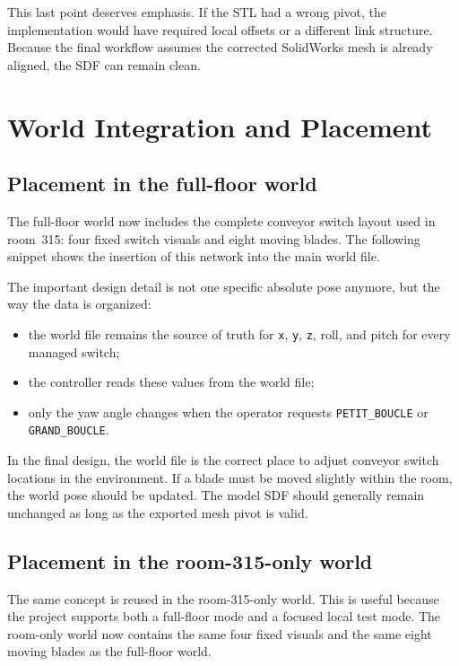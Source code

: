 \documentclass[11pt,a4paper]{article}
\begin{document}
This last point deserves emphasis. If the STL had a wrong pivot, the implementation would have required local offsets or a different link structure. Because the final workflow assumes the corrected SolidWorks mesh is already aligned, the SDF can remain clean.

\section{World Integration and Placement}
\subsection{Placement in the full-floor world}
The full-floor world now includes the complete conveyor switch layout used in room~315: four fixed switch visuals and eight moving blades. The following snippet shows the insertion of this network into the main world file.



The important design detail is not one specific absolute pose anymore, but the way the data is organized:
\begin{itemize}
\item the world file remains the source of truth for \texttt{x}, \texttt{y}, \texttt{z}, roll, and pitch for every managed switch;
\item the controller reads these values from the world file;
\item only the yaw angle changes when the operator requests \texttt{PETIT\_BOUCLE} or \texttt{GRAND\_BOUCLE}.
\end{itemize}

In the final design, the world file is the correct place to adjust conveyor switch locations in the environment. If a blade must be moved slightly within the room, the world pose should be updated. The model SDF should generally remain unchanged as long as the exported mesh pivot is valid.

\subsection{Placement in the room-315-only world}
The same concept is reused in the room-315-only world. This is useful because the project supports both a full-floor mode and a focused local test mode. The room-only world now contains the same four fixed visuals and the same eight moving blades as the full-floor world.
\end{document}

